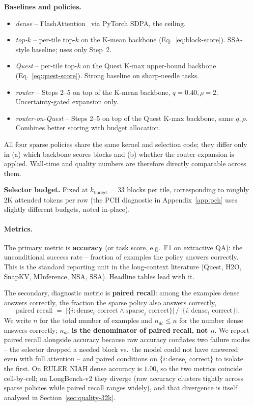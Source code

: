 \documentclass[11pt]{article}
\theoremstyle{remark}
\newcommand{\kbudget}{k_{\text{budget}}}
\begin{document}
\textbf{Baselines and policies.}
\begin{itemize}[leftmargin=*,topsep=0.2em,itemsep=0.1em]
    \item \emph{dense} -- FlashAttention~\citep{dao2022flashattention} via PyTorch SDPA, the ceiling.
    \item \emph{top-$k$} -- per-tile top-$k$ on the K-mean backbone (Eq.~\ref{eq:block-score}). SSA-style baseline; uses only Step~2.
    \item \emph{Quest} -- per-tile top-$k$ on the Quest K-max upper-bound backbone (Eq.~\ref{eq:quest-score}). Strong baseline on sharp-needle tasks.
    \item \emph{router} -- Steps 2--5 on top of the K-mean backbone, $q = 0.40, \rho = 2$. Uncertainty-gated expansion only.
    \item \emph{router-on-Quest} -- Steps 2--5 on top of the Quest K-max backbone, same $q, \rho$. Combines better scoring with budget allocation.
\end{itemize}
All four sparse policies share the same kernel and selection code; they differ only in (a) which backbone scores blocks and (b) whether the router expansion is applied. Wall-time and quality numbers are therefore directly comparable across them.

\textbf{Selector budget.} Fixed at $\kbudget = 33$ blocks per tile, corresponding to roughly $2\text{K}$ attended tokens per row (the PCH diagnostic in Appendix~\ref{app:pch} uses slightly different budgets, noted in-place).

\paragraph{Metrics.} The primary metric is \textbf{accuracy} (or task score, e.g.\ F1 on extractive QA): the unconditional success rate -- fraction of examples the policy answers correctly. This is the standard reporting unit in the long-context literature (Quest, H2O, SnapKV, MInference, NSA, SSA). Headline tables lead with it.

The secondary, diagnostic metric is \textbf{paired recall}: among the examples dense answers correctly, the fraction the sparse policy also answers correctly,
\[
\text{paired recall} \;=\; \bigl|\{i : \text{dense}_i \text{ correct} \wedge \text{sparse}_i \text{ correct}\}\bigr| \,/\, \bigl|\{i : \text{dense}_i \text{ correct}\}\bigr|.
\]
We write $n$ for the total number of examples and $n_{dc} \le n$ for the number dense answers correctly; \textbf{$n_{dc}$ is the denominator of paired recall, not $n$}. We report paired recall alongside accuracy because raw accuracy conflates two failure modes -- the selector dropped a needed block vs.\ the model could not have answered even with full attention -- and paired conditions on $\{i : \text{dense}_i \text{ correct}\}$ to isolate the first. On RULER NIAH dense accuracy is $1.00$, so the two metrics coincide cell-by-cell; on LongBench-v2 they diverge (raw accuracy clusters tightly across sparse policies while paired recall ranges widely), and that divergence is itself analysed in Section~\ref{sec:quality-32k}.
\end{document}
